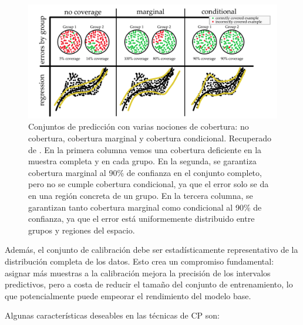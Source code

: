 \begin{figure}[h]
    \centering
    \includegraphics[width=\textwidth]{capitulos/cap_02/imagenes/coverage_types.png}
    \caption[
        Conjuntos de predicción con varias nociones de cobertura: no cobertura, cobertura marginal y cobertura
        condicional. Recuperado de \cite{angelopoulos2021}.
    ]{
        Conjuntos de predicción con varias nociones de cobertura: no cobertura, cobertura marginal y cobertura
        condicional. Recuperado de \cite{angelopoulos2021}.
        En la primera columna vemos una cobertura deficiente en la muestra completa y en cada grupo. 
        En la segunda, se garantiza cobertura marginal al 90\% de confianza en el conjunto completo, pero no 
        se cumple cobertura condicional, ya que el error solo se da en una región concreta de un grupo.
        En la tercera columna, se garantizan tanto cobertura marginal como condicional al 90\% de confianza,
        ya que el error está uniformemente distribuido entre grupos y regiones del espacio. 
    } 
    \label{fig:coverage}
\end{figure}

Además, el conjunto de calibración debe ser estadísticamente representativo de la distribución completa de los 
datos. Esto crea un compromiso fundamental: asignar más muestras a la calibración mejora la precisión de los 
intervalos predictivos, pero a costa de reducir el tamaño del conjunto de entrenamiento, lo que potencialmente 
puede empeorar el rendimiento del modelo base.

Algunas características deseables en las técnicas de CP son:


